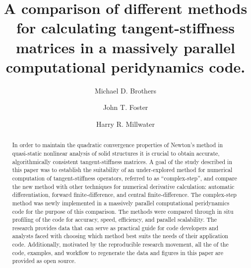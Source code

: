 \documentclass[preprint,12pt]{elsarticle}
\begin{document}
\begin{frontmatter}


\author{Michael D. Brothers}
\author{John T. Foster}

\author{Harry R. Millwater\corref{}}
\address{Mechanical Engineering Department, The University of Texas at San Antonio}


\title{A comparison of different methods for calculating tangent-stiffness matrices in a massively parallel computational peridynamics code.}


\begin{abstract} %
In order to maintain the quadratic convergence properties of Newton's method in quasi-static nonlinear analysis of solid structures it is crucial to obtain accurate, algorithmically consistent tangent-stiffness matrices. A goal of the study described in this paper was to establish the suitability of an under-explored method for numerical computation of tangent-stiffness operators, referred to as ``complex-step'', and compare the new method with other techniques for numerical derivative calculation: automatic differentiation, forward finite-difference, and central finite-difference. The complex-step method was newly implemented in a massively parallel computational peridynamics code for the purpose of this comparison. The methods were compared through in situ profiling of the code for accuracy, speed, efficiency, and parallel scalability. The research provides data that can serve as practical guide for code developers and analysts faced with choosing which method best suits the needs of their application code. Additionally, motivated by the reproducible research movement, all the of the code, examples, and workflow to regenerate the data and figures in this paper are provided as open source.



\end{abstract}
\end{frontmatter}
\end{document}
